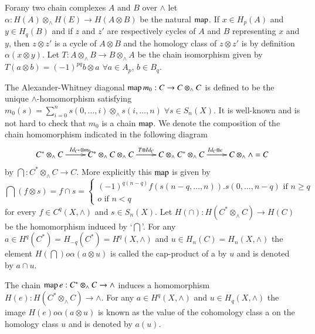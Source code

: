 For\pageoriginale any two chain complexes $A$ and $B$ over $\wedge$
let $\alpha : 
H(A) \otimes_{\wedge} H (E) \to H(A \otimes B)$ be the natural $\operatorname{map}$. If
$x \in H_p (A)$ and $y \in H_q (B)$ and if $z$ and $z'$ are
respectively cycles of $A$ and $B$ representing $x$ and $y$, then $z
\otimes z'$ is a cycle of $A\otimes B$ and the homology class of $z
\otimes z'$ is by definition $\alpha (x \otimes y)$. Let $T: A\otimes_{\wedge}
B\to B \otimes_\wedge A$ be the chain isomorphism given by $T(a
\otimes b)= (-1)^{pq} b \otimes a$ $\forall a \in A_p$, $b \in
B_q$. 

The Alexander-Whitney diagonal $\operatorname{map} m_0 : C \to C \otimes_{\wedge}
C$ is defined to be the unique $\wedge$-homomorphism satisfying $m_0
(s) = \sum\limits^{n}_{i=0} s (0,\ldots, i) \otimes_{\wedge} s
(i,\ldots,n) \; \forall s \in S_n  (X)$. It is well-known and is not
hard to check that $m_0$ is a chain $\operatorname{map}$. We denote the composition of
the chain homomorphism indicated in the following diagram 
\[
\xymatrix{
C^* \otimes_{\wedge} C \ar[r]^{Id_{C^*} \otimes m_0} & C^*
\otimes_{\wedge} C \otimes_{\wedge} C \ar[r]^{T\otimes Id_C} & 
C\otimes_{\wedge} C^* \otimes_{\wedge} C  \ar[r]^{Id_C \otimes e}
& C\otimes_{\wedge} \wedge = C 
}
\]
by $\bigcap : C^* \otimes_{\wedge} C\to C$. More explicitly this $\operatorname{map}$ is
given by  
{\fontsize{10}{12}\selectfont
$$
\bigcap (f \otimes s) = f \cap s=
\begin{cases}
(-1)^{q(n-q)} f (s (n-q, \ldots, n)). s (0, \ldots, n-q) \text{ if } n
  \geq q\\ 
o \text{ if  } n <  q
\end{cases}
$$}\relax    
for every $f \in C^q (X, \wedge)$ and $s \in S_n (X)$. Let
$H (\cap) : H (C^* \otimes_{\wedge} C) \to H (C)$ be the homomorphism
induced by `$\bigcap$'. For any\pageoriginale $a \in H^q(C^*) =
H_{-q} (C^*) = H^q (X, \wedge)$ and $u \in H_n (C) = H_n (X, \wedge)$ the
element $H(\bigcap) o \alpha (a \otimes u)$ is called the cap-product
of a by $u$ and is denoted by $a \cap u$. 

The chain $\operatorname{map} e : C^* \otimes_{\wedge} C \to \wedge $ induces a
homomorphism $H(e) : H (C^* \otimes_\wedge C) \to \wedge$. For any $a
\in H^q (X, \wedge)$ and $u \in H_q (X, \wedge)$ the image
$H(e) o \alpha (a \otimes u)$ is known as the value of the cohomology
class a on the homology class $u$ and is denoted by $a(u)$. 
 
